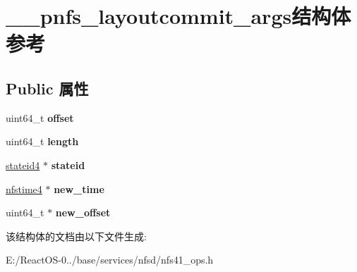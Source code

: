 \hypertarget{struct____pnfs__layoutcommit__args}{}\section{\+\_\+\+\_\+pnfs\+\_\+layoutcommit\+\_\+args结构体 参考}
\label{struct____pnfs__layoutcommit__args}
\subsection*{Public 属性}
\begin{DoxyCompactItemize}
\item 
\mbox{\label{struct____pnfs__layoutcommit__args_aabbc0a7bf03c20e5d01924bdfd70236c}} 
uint64\+\_\+t {\bfseries offset}
\item 
\mbox{\label{struct____pnfs__layoutcommit__args_aa950444b3b6f2b57ddeee471faf4eddc}} 
uint64\+\_\+t {\bfseries length}
\item 
\mbox{\label{struct____pnfs__layoutcommit__args_a78b801ea9f89ad9652e7929b96aa38e9}} 
\hyperlink{struct____stateid4}{stateid4} $\ast$ {\bfseries stateid}
\item 
\mbox{\label{struct____pnfs__layoutcommit__args_a4bccda4c28b599dc8a7a9a690c291b46}} 
\hyperlink{struct____nfstime4}{nfstime4} $\ast$ {\bfseries new\+\_\+time}
\item 
\mbox{\label{struct____pnfs__layoutcommit__args_aa047de13ede0e6c7273e1a5b7d1a95c3}} 
uint64\+\_\+t $\ast$ {\bfseries new\+\_\+offset}
\end{DoxyCompactItemize}


该结构体的文档由以下文件生成\+:\begin{DoxyCompactItemize}
\item 
E\+:/\+React\+O\+S-\/0../base/services/nfsd/nfs41\+\_\+ops.\+h\end{DoxyCompactItemize}
